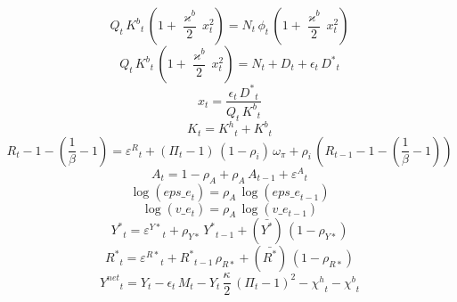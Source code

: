 \begin{dmath}
{Q}_{t}\, {K^{b}}_{t}\, \left(1+\frac{{\varkappa^{b}}}{2}\, {x}_{t}^{2}\right)={N}_{t}\, {\phi}_{t}\, \left(1+\frac{{\varkappa^{b}}}{2}\, {x}_{t}^{2}\right)
\end{dmath}
\begin{dmath}
{Q}_{t}\, {K^{b}}_{t}\, \left(1+\frac{{\varkappa^{b}}}{2}\, {x}_{t}^{2}\right)={N}_{t}+{D}_{t}+{\epsilon}_{t}\, {D^{*}}_{t}
\end{dmath}
\begin{dmath}
{x}_{t}=\frac{{\epsilon}_{t}\, {D^{*}}_{t}}{{Q}_{t}\, {K^{b}}_{t}}
\end{dmath}
\begin{dmath}
{K}_{t}={K^{h}}_{t}+{K^{b}}_{t}
\end{dmath}
\begin{dmath}
{R}_{t}-1-\left(\frac{1}{{\beta}}-1\right)={\varepsilon^{R}}_{t}+\left({\Pi}_{t}-1\right)\, \left(1-{\rho_{i}}\right)\, {\omega_{\pi}}+{\rho_{i}}\, \left({R}_{t-1}-1-\left(\frac{1}{{\beta}}-1\right)\right)
\end{dmath}
\begin{dmath}
{A}_{t}=1-{\rho_{A}}+{\rho_{A}}\, {A}_{t-1}+{\varepsilon^{A}}_{t}
\end{dmath}
\begin{dmath}
\log\left({eps\_e}_{t}\right)={\rho_{A}}\, \log\left({eps\_e}_{t-1}\right)
\end{dmath}
\begin{dmath}
\log\left({v\_e}_{t}\right)={\rho_{A}}\, \log\left({v\_e}_{t-1}\right)
\end{dmath}
\begin{dmath}
{Y^{*}}_{t}={\varepsilon^{Y*}}_{t}+{\rho_{Y*}}\, {Y^{*}}_{t-1}+(\bar{Y^{*}})\, \left(1-{\rho_{Y*}}\right)
\end{dmath}
\begin{dmath}
{R^{*}}_{t}={\varepsilon^{R*}}_{t}+{R^{*}}_{t-1}\, {\rho_{R*}}+(\bar{R^{*}})\, \left(1-{\rho_{R*}}\right)
\end{dmath}
\begin{dmath}
{Y^{net}}_{t}={Y}_{t}-{\epsilon}_{t}\, {M}_{t}-{Y}_{t}\, \frac{{\kappa}}{2}\, \left({\Pi}_{t}-1\right)^{2}-{\chi^{h}}_{t}-{\chi^{b}}_{t}
\end{dmath}
